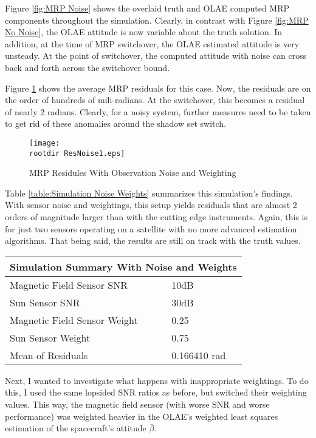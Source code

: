 \documentclass[11pt]{aiaa-tc}%
\newcommand{\rootdir}{./Figures/}
\begin{document}
Figure \ref{fig:MRP Noise} shows the overlaid truth and OLAE computed MRP components throughout the simulation. Clearly, in contrast with Figure \ref{fig:MRP No Noise}, the OLAE attitude is now variable about the truth solution. In addition, at the time of MRP switchover, the OLAE estimated attitude is very unsteady. At the point of switchover, the computed attitude with noise can cross back and forth across the switchover bound. 

Figure \ref{fig:Res Noise1} shows the average MRP residuals for this case. Now, the residuals are on the order of hundreds of mili-radians. At the switchover, this becomes a residual of nearly 2 radians. Clearly, for a noisy system, further measures need to be taken to get rid of these anomalies around the shadow set switch. 

\begin{centering}
	\begin{figure}[Hh]
		\texttt{[image: \\rootdir ResNoise1.eps]}
		\caption{MRP Residules With Observation Noise and Weighting}
		\label{fig:Res Noise1}
	\end{figure}
\end{centering}

Table \ref{table:Simulation Noise Weights} summarizes this simulation's findings. With sensor noise and weightings, this setup yields residuals that are almost 2 orders of magnitude larger than with the cutting edge instruments. Again, this is for just two sensors operating on a satellite with no more advanced estimation algorithms. That being said, the results are still on track with the truth values.

\begin{center}
\label{table:Simulation Noise Weights}
\begin{tabular}{ |l|l| }
  \hline
	  \multicolumn{2}{|c|}{Simulation Summary With Noise and Weights} \\
	  \hline
	  Magnetic Field Sensor SNR & 10dB \\
	  Sun Sensor SNR & 30dB \\
	  Magnetic Field Sensor Weight & 0.25 \\
	  Sun Sensor Weight & 0.75 \\
	  Mean of Residuals & 0.166410 rad\\
	  \hline
	\end{tabular}
\end{center}

Next, I wanted to investigate what happens with inappropriate weightings. To do this, I used the same lopsided SNR ratios as before, but switched their weighting values. This way, the magnetic field sensor (with worse SNR and worse performance) was weighted heavier in the OLAE's weighted least squares estimation of the spacecraft's attitude $\bar{\beta}$. 
\end{document}
